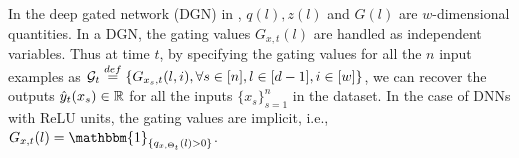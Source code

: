 In the deep gated network (DGN) in , $q(l),z(l)$ and $G(l)$ are $w$-dimensional quantities. In a DGN, the gating values $G_{x,t}(l)$ are handled as independent variables. Thus at time $t$, by specifying the gating values for all the $n$ input examples as $\mathcal{G}_t\stackrel{def}=\{G_{x_{s},t}(l,i), \forall s\in[n],l\in[d-1],i\in[w]\}$, we can recover the outputs $\hat{y}_t(x_s)\in \mathbb{R}$ for all the inputs $\{x_s\}_{s=1}^n$ in the dataset. In the case of DNNs with ReLU units, the gating values are implicit, i.e., $G_{x,t}(l)=\mathbbm{1}_{\{q_{x,\Theta_t}(l)>0\}}$.




\begin{comment}
\textbf{First order quantities of path (\Cref{tb:dgn-path}):} We use $p\rsa (\cdot)$ to denote the fact that path $p$ passes through $(\cdot)$, which is either a node or a weight.  For $m\in[d_{net}]$, let $l'(m)$ denote the layer a weight $\tv(m)$ belongs to, and let $p\rsa\tv(m)$, then the sensitivity of path with respect to $\tv(m)$ at time $t$ is given by $\varphi_{t,p}(m)$. Note that, for $\tv(m)$ such that $p\bcancel{\rsa}\tv(m)$, it follows that $\varphi_{t,p}(m)=0$. The gradient of the path with respect to all the weights can be collected in a vector as $\varphi_{t,p}=(\varphi_{t,p}(m),m\in[d_{net}])\in\R^{d_{net}}$, which has only exactly $d$ non-zero co-ordinates.
\end{comment}
